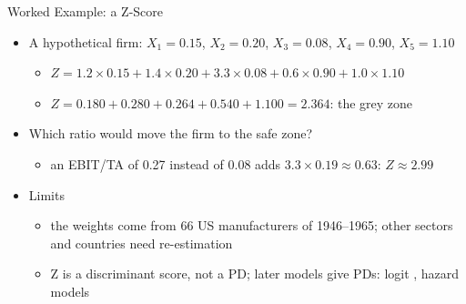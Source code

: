 \begin{frame}{Worked Example: a Z-Score}
\itemsize{\small}
\begin{itemize}
    \item A hypothetical firm: $X_1 = 0.15$, $X_2 = 0.20$, $X_3 = 0.08$, $X_4 = 0.90$, $X_5 = 1.10$
    \begin{itemize}
        \item $Z = 1.2 \times 0.15 + 1.4 \times 0.20 + 3.3 \times 0.08 + 0.6 \times 0.90 + 1.0 \times 1.10$
        \item $Z = 0.180 + 0.280 + 0.264 + 0.540 + 1.100 = 2.364$: the grey zone
    \end{itemize}
    \item Which ratio would move the firm to the safe zone?
    \begin{itemize}
        \item an EBIT/TA of 0.27 instead of 0.08 adds $3.3 \times 0.19 \approx 0.63$: $Z \approx 2.99$
    \end{itemize}
    \item Limits
    \begin{itemize}
        \item the weights come from 66 US manufacturers of 1946--1965; other sectors and countries need re-estimation
        \item Z is a discriminant score, not a PD; later models give PDs: logit , hazard models 
    \end{itemize}
\end{itemize}
\end{frame}

